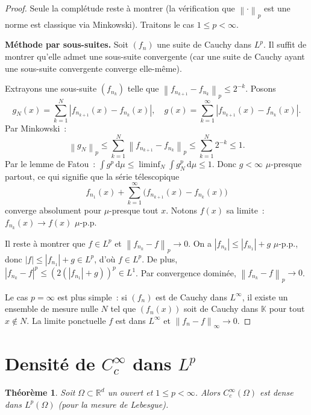 \documentclass[a4paper,12pt]{book}
\newcommand{\R}{\mathbb{R}}
\newcommand{\K}{\mathbb{K}}
\newcommand{\dd}{\mathrm{d}}
\newcommand{\norm}[1]{\left\| #1 \right\|}
\newcommand{\abs}[1]{\left| #1 \right|}
\theoremstyle{definition}
\theoremstyle{plain}
\newtheorem{theoreme}[definition]{Théorème}
\theoremstyle{remark}
\begin{document}
\begin{proof}
Seule la complétude reste à montrer (la vérification que $\norm{\cdot}_p$ est une norme
est classique via Minkowski). Traitons le cas $1 \le p < \infty$.

\textbf{Méthode par sous-suites.} Soit $(f_n)$ une suite de Cauchy dans $L^p$. Il suffit
de montrer qu'elle admet une sous-suite convergente (car une suite de Cauchy ayant une
sous-suite convergente converge elle-même).

Extrayons une sous-suite $(f_{n_k})$ telle que
$\norm{f_{n_{k+1}} - f_{n_k}}_p \le 2^{-k}$. Posons
\[
  g_N(x) = \sum_{k=1}^{N} \abs{f_{n_{k+1}}(x) - f_{n_k}(x)}, \quad
  g(x) = \sum_{k=1}^{\infty} \abs{f_{n_{k+1}}(x) - f_{n_k}(x)}.
\]
Par Minkowski~:
\[
  \norm{g_N}_p \le \sum_{k=1}^N \norm{f_{n_{k+1}} - f_{n_k}}_p \le \sum_{k=1}^N 2^{-k} \le 1.
\]
Par le lemme de Fatou~:
$\int g^p\,\dd\mu \le \liminf_N \int g_N^p\,\dd\mu \le 1$. Donc $g < \infty$
$\mu$-presque partout, ce qui signifie que la série télescopique
\[
  f_{n_1}(x) + \sum_{k=1}^\infty \bigl(f_{n_{k+1}}(x) - f_{n_k}(x)\bigr)
\]
converge absolument pour $\mu$-presque tout $x$. Notons $f(x)$ sa limite~: $f_{n_k}(x) \to f(x)$
$\mu$-p.p.

Il reste à montrer que $f \in L^p$ et $\norm{f_{n_k} - f}_p \to 0$.
On a $\abs{f_{n_k}} \le \abs{f_{n_1}} + g$ $\mu$-p.p., donc
$\abs{f} \le \abs{f_{n_1}} + g \in L^p$, d'où $f \in L^p$.
De plus, $\abs{f_{n_k} - f}^p \le (2(\abs{f_{n_1}} + g))^p \in L^1$. Par convergence
dominée, $\norm{f_{n_k} - f}_p \to 0$.

Le cas $p = \infty$ est plus simple~: si $(f_n)$ est de Cauchy dans $L^\infty$, il
existe un ensemble de mesure nulle $N$ tel que $(f_n(x))$ soit de Cauchy dans $\K$ pour
tout $x \notin N$. La limite ponctuelle $f$ est dans $L^\infty$ et
$\norm{f_n - f}_\infty \to 0$.
\end{proof}

\section{Densité de $C_c^\infty$ dans $L^p$}

\begin{theoreme}
\label{thm:densite-Cc-Lp}
Soit $\Omega \subset \R^d$ un ouvert et $1 \le p < \infty$. Alors $C_c^\infty(\Omega)$
est dense dans $L^p(\Omega)$ (pour la mesure de Lebesgue).
\end{theoreme}
\end{document}
